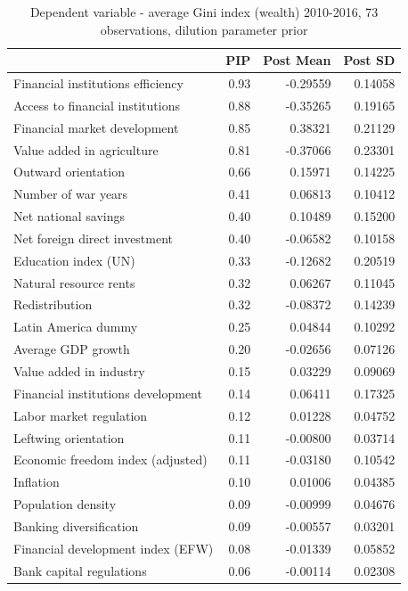 \documentclass[a4paper,11pt]{article}
\begin{document}
\begin{table}[!ht]
\footnotesize
\centering
\caption{Dependent variable - average Gini index (wealth) 2010-2016, 73 observations, dilution parameter prior}
\label{table:res3}
\begin{tabular}{lrrr}
  \toprule
 & PIP & Post Mean & Post SD \\ 
  \midrule
  Financial institutions efficiency & 0.93 & -0.29559 & 0.14058 \\ 
  Access to financial institutions & 0.88 & -0.35265 & 0.19165 \\ 
  Financial market development & 0.85 & 0.38321 & 0.21129 \\ 
  Value added in agriculture & 0.81 & -0.37066 & 0.23301 \\ 
  Outward orientation & 0.66 & 0.15971 & 0.14225 \\ 
  Number of war years & 0.41 & 0.06813 & 0.10412 \\ 
  Net national savings & 0.40 & 0.10489 & 0.15200 \\ 
  Net foreign direct investment & 0.40 & -0.06582 & 0.10158 \\ 
  Education index (UN) & 0.33 & -0.12682 & 0.20519 \\ 
  Natural resource rents & 0.32 & 0.06267 & 0.11045 \\ 
  Redistribution & 0.32 & -0.08372 & 0.14239 \\ 
  Latin America dummy & 0.25 & 0.04844 & 0.10292 \\ 
  Average GDP growth & 0.20 & -0.02656 & 0.07126 \\ 
  Value added in industry & 0.15 & 0.03229 & 0.09069 \\ 
  Financial institutions development & 0.14 & 0.06411 & 0.17325 \\ 
  Labor market regulation & 0.12 & 0.01228 & 0.04752 \\ 
  Leftwing orientation & 0.11 & -0.00800 & 0.03714 \\ 
  Economic freedom index (adjusted) & 0.11 & -0.03180 & 0.10542 \\ 
  Inflation & 0.10 & 0.01006 & 0.04385 \\ 
  Population density & 0.09 & -0.00999 & 0.04676 \\ 
  Banking diversification & 0.09 & -0.00557 & 0.03201 \\ 
  Financial development index (EFW) & 0.08 & -0.01339 & 0.05852 \\ 
  Bank capital regulations & 0.06 & -0.00114 & 0.02308 \\ 

\end{tabular}
\end{table}
\end{document}
